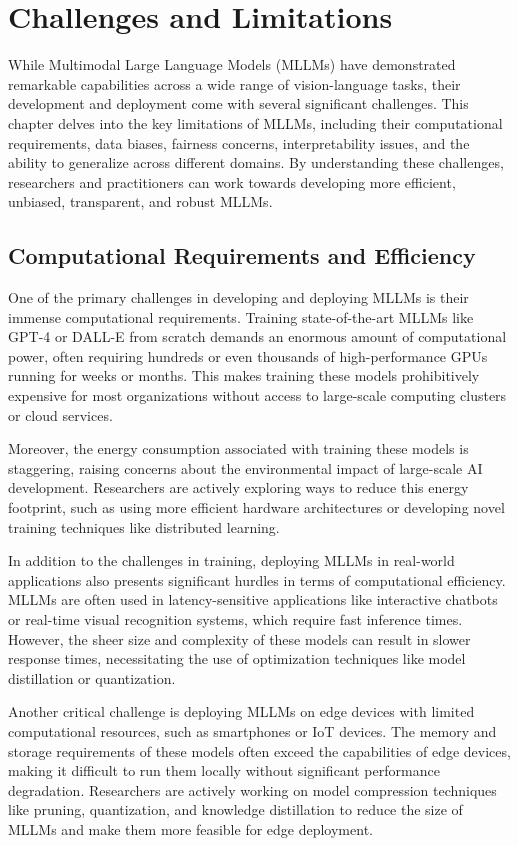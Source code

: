 \chapter{Challenges and Limitations}

While Multimodal Large Language Models (MLLMs) have demonstrated remarkable capabilities across a wide range of vision-language tasks, their development and deployment come with several significant challenges. This chapter delves into the key limitations of MLLMs, including their computational requirements, data biases, fairness concerns, interpretability issues, and the ability to generalize across different domains. By understanding these challenges, researchers and practitioners can work towards developing more efficient, unbiased, transparent, and robust MLLMs.

\section{Computational Requirements and Efficiency}

One of the primary challenges in developing and deploying MLLMs is their immense computational requirements. Training state-of-the-art MLLMs like GPT-4 or DALL-E from scratch demands an enormous amount of computational power, often requiring hundreds or even thousands of high-performance GPUs running for weeks or months. This makes training these models prohibitively expensive for most organizations without access to large-scale computing clusters or cloud services. 

Moreover, the energy consumption associated with training these models is staggering, raising concerns about the environmental impact of large-scale AI development. Researchers are actively exploring ways to reduce this energy footprint, such as using more efficient hardware architectures or developing novel training techniques like distributed learning.

In addition to the challenges in training, deploying MLLMs in real-world applications also presents significant hurdles in terms of computational efficiency. MLLMs are often used in latency-sensitive applications like interactive chatbots or real-time visual recognition systems, which require fast inference times. However, the sheer size and complexity of these models can result in slower response times, necessitating the use of optimization techniques like model distillation or quantization.

Another critical challenge is deploying MLLMs on edge devices with limited computational resources, such as smartphones or IoT devices. The memory and storage requirements of these models often exceed the capabilities of edge devices, making it difficult to run them locally without significant performance degradation. Researchers are actively working on model compression techniques like pruning, quantization, and knowledge distillation to reduce the size of MLLMs and make them more feasible for edge deployment.

